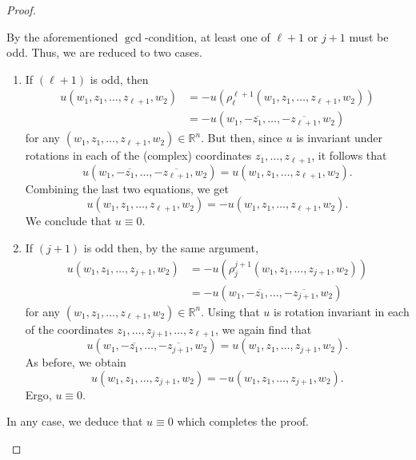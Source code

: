 \documentclass[10pt, reqno]{amsart}
\newcommand{\RR}{\mathbb{R}}
\numberwithin{equation}{section}
\theoremstyle{definition}
\theoremstyle{remark}
\theoremstyle{plain}
\begin{document}
\begin{proof}
\begin{enumerate}[leftmargin=*]
			By the aforementioned $\gcd$-condition, at least one of $\ell+1$ or $j+1$ must be odd. Thus, we are reduced to two cases.
			\begin{enumerate}[label=(\roman*)]
				\item If $(\ell+1)$ is odd, then
				\[
				\begin{aligned}
					u(w_1, z_1, \dots, z_{\ell+1}, w_2)
					&= - u(\rho_\ell^{\ell+1} (w_1, z_1, \dots, z_{\ell+1}, w_2)) \\
					&= -u(w_1, -\overline{z_1}, \dots, -\overline{z_{\ell+1}}, w_2)
				\end{aligned}
				\]
				for any $(w_1, z_1, \dots, z_{\ell+1}, w_2) \in \RR^n$. But then, since $u$ is invariant under rotations in each of the (complex) coordinates $z_1, \dots, z_{\ell + 1}$, it follows that
				\[
				u(w_1, -\overline{z_1}, \dots, -\overline{z_{\ell+1}}, w_2) = u(w_1, z_1, \dots, z_{\ell+1}, w_2).
				\]
				Combining the last two equations, we get
				\[
				u(w_1, z_1, \dots, z_{\ell+1}, w_2) = -u(w_1, z_1, \dots, z_{\ell+1}, w_2).
				\]
				We conclude that $u\equiv 0$.
				\item If $(j+1)$ is odd then, by the same argument,
				\[
				\begin{aligned}
					u(w_1, z_1, \dots, z_{j+1}, w_2)
					&= - u(\rho_j^{j+1} (w_1, z_1, \dots, z_{j+1}, w_2)) \\
					&= -u(w_1, -\overline{z_1}, \dots, -\overline{z_{j+1}}, w_2)
				\end{aligned}
				\]
				for any $(w_1, z_1, \dots, z_{\ell+1}, w_2) \in \RR^n$. Using that  $u$ is rotation invariant in each of the coordinates  $z_1, \dots, z_{j+1}, \dots, z_{\ell + 1}$, we again find that
				\[
				u(w_1, -\overline{z_1}, \dots, -\overline{z_{j+1}}, w_2) = u(w_1, z_1, \dots, z_{j+1}, w_2).
				\]
				As before, we obtain
				\[
				u(w_1, z_1, \dots, z_{j+1}, w_2) = -u(w_1, z_1, \dots, z_{j+1}, w_2).
				\]
				Ergo, $u\equiv 0$.
			\end{enumerate}
			In any case, we deduce that $u \equiv 0$ which completes the proof.
		\end{enumerate}
		
	\end{proof}
	
\end{document}
